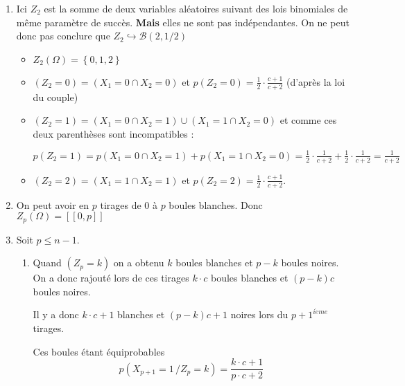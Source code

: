 \documentclass[a4paper, 11pt,reqno]{article}
\begin{document}
\begin{correction}
\begin{enumerate}
\item Ici $Z_{2}$ est la somme de deux variables al\'{e}atoires suivant des
lois binomiales de m\^{e}me param\`{e}tre de succ\`{e}s. \textbf{Mais }elles
ne sont pas ind\'{e}pendantes. On ne peut donc pas conclure que $%
Z_{2}\hookrightarrow \mathcal{B}\left( 2,1/2\right) $

\begin{itemize}
\item $Z_{2}\left( \Omega \right) =\left\{ 0,1,2\right\} $

\item $\left( Z_{2}=0\right) =\left( X_{1}=0\cap X_{2}=0\right) $ et $%
p\left( Z_{2}=0\right) =\displaystyle
\frac{1}{2}\cdot \frac{c+1}{c+2}$ (d'apr\`{e}s la loi du couple)

\item $\left( Z_{2}=1\right) =\left( X_{1}=0\cap X_{2}=1\right) \cup \left(
X_{1}=1\cap X_{2}=0\right) $ et comme ces deux parenth\`{e}ses sont
incompatibles :

$p\left( Z_{2}=1\right) =p\left( X_{1}=0\cap X_{2}=1\right) +p\left(
X_{1}=1\cap X_{2}=0\right) =\displaystyle
\frac{1}{2}\cdot \frac{1}{c+2}+\frac{1}{2}\cdot \frac{1}{c+2}=\frac{1}{c+2}$

\item $\left( Z_{2}=2\right) =\left( X_{1}=1\cap X_{2}=1\right) $ et $%
p\left( Z_{2}=2\right) =\displaystyle
\frac{1}{2}\cdot \frac{c+1}{c+2}$.
\end{itemize}

\item On peut avoir en $p$ tirages de 0 \`{a} $p$ boules blanches. Donc $%
Z_{p}\left( \Omega \right) =\left[ \left[ 0,p\right] \right] $

\item Soit $p\leqslant n-1$.

\begin{enumerate}
\item Quand $\left( Z_{p}=k\right) $ on a obtenu $k$ boules blanches et $p-k 
$ boules noires. On a donc rajout\'{e} lors de ces tirages $k\cdot c$ boules
blanches et $\left( p-k\right) c$ boules noires.

Il y a donc $k\cdot c+1$ blanches et $\left( p-k\right) c+1$ noires lors du $%
p+1^{i\grave{e}me}$ tirages$.$

Ces boules \'{e}tant \'{e}quiprobables 
\begin{equation*}
p(X_{p+1}=1\,/Z_{p}=k)=\frac{k\cdot c+1}{p\cdot c+2}
\end{equation*}


\end{enumerate}
\end{enumerate}
\end{correction}
\end{document}

